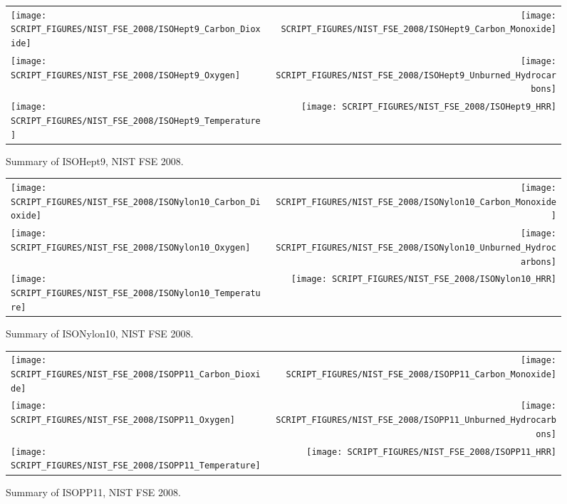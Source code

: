 \begin{figure}[p]
\begin{tabular*}{\textwidth}{l@{\extracolsep{\fill}}r}
\texttt{[image: SCRIPT\_FIGURES/NIST\_FSE\_2008/ISOHept9\_Carbon\_Dioxide]} &
\texttt{[image: SCRIPT\_FIGURES/NIST\_FSE\_2008/ISOHept9\_Carbon\_Monoxide]} \\
\texttt{[image: SCRIPT\_FIGURES/NIST\_FSE\_2008/ISOHept9\_Oxygen]} &
\texttt{[image: SCRIPT\_FIGURES/NIST\_FSE\_2008/ISOHept9\_Unburned\_Hydrocarbons]} \\
\texttt{[image: SCRIPT\_FIGURES/NIST\_FSE\_2008/ISOHept9\_Temperature]} &
\texttt{[image: SCRIPT\_FIGURES/NIST\_FSE\_2008/ISOHept9\_HRR]}
\end{tabular*}
\caption[Summary of ISOHept9, NIST FSE 2008]{Summary of ISOHept9, NIST FSE 2008.}
\label{NIST_FSE_1994_ISOHept9}
\end{figure}

\begin{figure}[p]
\begin{tabular*}{\textwidth}{l@{\extracolsep{\fill}}r}
\texttt{[image: SCRIPT\_FIGURES/NIST\_FSE\_2008/ISONylon10\_Carbon\_Dioxide]} &
\texttt{[image: SCRIPT\_FIGURES/NIST\_FSE\_2008/ISONylon10\_Carbon\_Monoxide]} \\
\texttt{[image: SCRIPT\_FIGURES/NIST\_FSE\_2008/ISONylon10\_Oxygen]} &
\texttt{[image: SCRIPT\_FIGURES/NIST\_FSE\_2008/ISONylon10\_Unburned\_Hydrocarbons]} \\
\texttt{[image: SCRIPT\_FIGURES/NIST\_FSE\_2008/ISONylon10\_Temperature]} &
\texttt{[image: SCRIPT\_FIGURES/NIST\_FSE\_2008/ISONylon10\_HRR]}
\end{tabular*}
\caption[Summary of ISONylon10, NIST FSE 2008]{Summary of ISONylon10, NIST FSE 2008.}
\label{NIST_FSE_1994_ISONylon10}
\end{figure}

\begin{figure}[p]
\begin{tabular*}{\textwidth}{l@{\extracolsep{\fill}}r}
\texttt{[image: SCRIPT\_FIGURES/NIST\_FSE\_2008/ISOPP11\_Carbon\_Dioxide]} &
\texttt{[image: SCRIPT\_FIGURES/NIST\_FSE\_2008/ISOPP11\_Carbon\_Monoxide]} \\
\texttt{[image: SCRIPT\_FIGURES/NIST\_FSE\_2008/ISOPP11\_Oxygen]} &
\texttt{[image: SCRIPT\_FIGURES/NIST\_FSE\_2008/ISOPP11\_Unburned\_Hydrocarbons]} \\
\texttt{[image: SCRIPT\_FIGURES/NIST\_FSE\_2008/ISOPP11\_Temperature]} &
\texttt{[image: SCRIPT\_FIGURES/NIST\_FSE\_2008/ISOPP11\_HRR]}
\end{tabular*}
\caption[Summary of ISOPP11, NIST FSE 2008]{Summary of ISOPP11, NIST FSE 2008.}
\label{NIST_FSE_1994_ISOPropylene11}
\end{figure}

